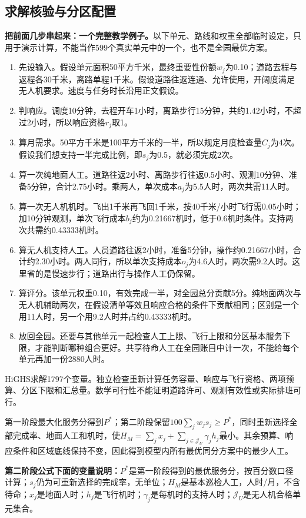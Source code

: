 \documentclass[12pt,a4paper]{article}
\numberwithin{equation}{section}
\begin{document}
\subsection{求解核验与分区配置}
\noindent\textbf{把前面几步串起来：一个完整教学例子。}以下单元、路线和权重全部临时设定，只用于演示计算，不能当作599个真实单元中的一个，也不是全园最优方案。
\begin{enumerate}
\item 先设输入。假设单元面积50平方千米，最终重要性份额$w_j$为0.10；道路去程与返程各30千米，离路单程1千米。假设道路往返连通、允许使用，开阔度满足无人机要求。速度与任务时长沿用正文假设。
\item 判响应。调度10分钟，去程开车1小时，离路步行15分钟，共约1.42小时，不超过2小时，所以响应资格$r_j$取1。
\item 算月需求。50平方千米是100平方千米的一半，所以规定月度检查量$C_j$为4次。假设我们想支持一半完成比例，即$s_j$为0.5，就必须完成2次。
\item 算一次纯地面人工。道路往返2小时、离路步行往返0.5小时、观测10分钟、准备5分钟，合计2.75小时。乘两人，单次成本$a_j$为5.5人时，两次共需11人时。
\item 算一次无人机机时。飞出1千米再飞回1千米，按40千米/小时飞行需0.05小时；加10分钟观测，单次飞行成本$b_j$约为0.21667机时，低于0.6机时条件。支持两次共需约0.43333机时。
\item 算无人机支持人工。人员道路往返2小时，准备5分钟，操作约0.21667小时，合计约2.30小时。两人同行，所以单次支持成本$o_j$为4.6人时，两次需9.2人时。这里省的是慢速步行；道路出行与操作人工仍保留。
\item 算评分。该单元权重0.10，有效完成一半，对全园总分贡献5分。纯地面两次与无人机辅助两次，在假设清单等效且响应合格的条件下贡献相同；区别是一个用11人时，另一个用9.2人时并占约0.43333机时。
\item 放回全园。还要与其他单元一起检查人工上限、飞行上限和分区基本服务下限，才能判断哪种组合更好。共享待命人工在全园账目中计一次，不能给每个单元再加一份2880人时。
\end{enumerate}

HiGHS求解1797个变量。独立检查重新计算任务容量、响应与飞行资格、两项预算、分区下限和汇总量。数学可行性不能证明道路许可、观测有效性或实际排班可行。

第一阶段最大化服务分得到$P^*$；第二阶段保留$100\sum_jw_js_j\ge P^*$，同时重新选择全部完成率、地面人工和机时，使$H_M=\sum_jx_j+\sum_{j\in\mathcal J_U}\gamma_jh_j$最小。其余预算、响应条件和区域底线保持不变，因此得到模型内所有最优同分方案中的最少人工。

\noindent\textbf{第二阶段公式下面的变量说明：}$P^*$是第一阶段得到的最优服务分，按百分数口径计算；$s_j$仍为可重新选择的完成率，无单位；$H_M$是基本巡检人工，人时/月，不含待命；$x_j$是地面人时；$h_j$是飞行机时；$\gamma_j$是每机时的支持人时；$\mathcal J_U$是无人机合格单元集合。
\end{document}
